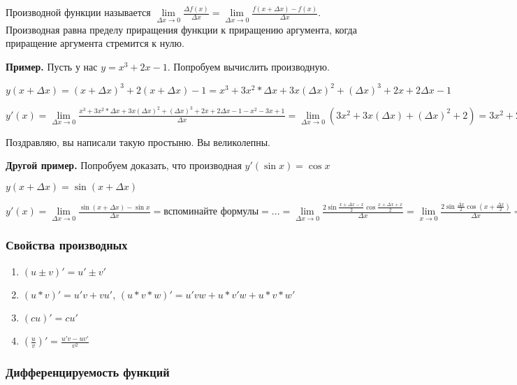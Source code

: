 \documentclass{article}
\begin{document}
\begin{flushleft}
\hfill

Производной функции называется $\lim\limits_{\Delta x \to 0} \frac{\Delta f(x)}{\Delta x} = \lim\limits_{\Delta x \to 0} \frac{f(x + \Delta x) - f(x)}{\Delta x}$. Производная равна пределу приращения функции к приращению аргумента, когда приращение аргумента стремится к нулю.

\hfill

\textbf{Пример.} Пусть у нас $y = x^3 + 2x - 1$. Попробуем вычислить производную.

$y(x + \Delta x) = (x + \Delta x)^3 + 2(x + \Delta x) - 1 = x^3 + 3x^2 * \Delta x + 3x(\Delta x)^2 + (\Delta x)^3 + 2x + 2\Delta x - 1$

$y'(x) = \lim\limits_{\Delta x \to 0} \frac{x^3 + 3x^2 * \Delta x + 3x (\Delta x)^2 + (\Delta x)^3 + 2x + 2\Delta x - 1 - x^2 - 3x + 1}{\Delta x} = \lim\limits_{\Delta x \to 0} (3x^2 + 3x(\Delta x) + (\Delta x)^2 + 2) = 3x^2 + 2$

Поздравляю, вы написали такую простыню. Вы великолепны.

\hfill

\textbf{Другой пример.} Попробуем доказать, что производная $y'(\sin x) = \cos x$

$y(x + \Delta x) = \sin(x + \Delta x)$

$y'(x) = \lim\limits_{\Delta x \to 0} \frac{\sin(x + \Delta x) - \sin x}{\Delta x} = \text{вспоминайте формулы} = ... = \lim\limits_{\Delta x \to 0} \frac{2 \sin \frac{x + \Delta x - x}{2} \cos \frac{x + \Delta x + x}{2}}{\Delta x} = \lim\limits_{x \to 0} \frac{2 \sin \frac{\Delta x}{2} \cos (x + \frac{\Delta x}{2})}{\Delta x} = \lim\limits_{x \to 0} \frac{2 \cos x}{2} = \cos x$

\subsubsection{Свойства производных}

\begin{enumerate}
    \item $(u \pm v)' = u' \pm v'$
    \item $(u * v)' = u' v + v u'$, $(u * v * w)' = u' v w + u * v' w + u * v * w'$
    \item $(cu)' = c u'$
    \item $(\frac{u}{v})' = \frac{u' v - u v'}{v^2}$
\end{enumerate}

\subsubsection{Дифференцируемость функций}


\end{flushleft}
\end{document}
